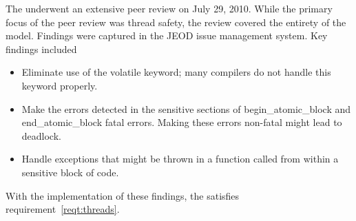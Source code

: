 \label{inspect:review}
The \ModelDesc underwent an extensive peer review on July 29, 2010.
While the primary focus of the peer review was thread safety, the review
covered the entirety of the model. Findings were captured in the
JEOD issue management system. Key findings included
\begin{itemize}
\item Eliminate use of the volatile keyword;
  many compilers do not handle this keyword properly.
\item Make the errors detected in the sensitive sections of
  begin\_atomic\_block and end\_atomic\_block fatal errors.
  Making these errors non-fatal might lead to deadlock.
\item Handle exceptions that might be thrown in a function called from
  within a sensitive block of code.
\end{itemize}
With the implementation of these findings, the \ModelDesc satisfies
requirement~\ref{reqt:threads}.
